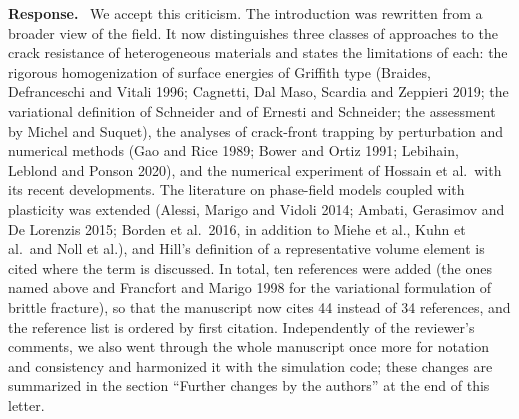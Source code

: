 \documentclass[pdflatex,sn-mathphys-num]{sn-jnl}
\newenvironment{response}
  {\par\noindent\textbf{Response.}\ }
  {\par}
\begin{document}
\begin{response}
We accept this criticism. The introduction was rewritten from a broader view of the field. It now distinguishes three classes of approaches to the crack resistance of heterogeneous materials and states the limitations of each: the rigorous homogenization of surface energies of Griffith type (Braides, Defranceschi and Vitali 1996; Cagnetti, Dal Maso, Scardia and Zeppieri 2019; the variational definition of Schneider and of Ernesti and Schneider; the assessment by Michel and Suquet), the analyses of crack-front trapping by perturbation and numerical methods (Gao and Rice 1989; Bower and Ortiz 1991; Lebihain, Leblond and Ponson 2020), and the numerical experiment of Hossain et al.\ with its recent developments. The literature on phase-field models coupled with plasticity was extended (Alessi, Marigo and Vidoli 2014; Ambati, Gerasimov and De Lorenzis 2015; Borden et al.\ 2016, in addition to Miehe et al., Kuhn et al.\ and Noll et al.), and Hill's definition of a representative volume element is cited where the term is discussed. In total, ten references were added (the ones named above and Francfort and Marigo 1998 for the variational formulation of brittle fracture), so that the manuscript now cites 44 instead of 34 references, and the reference list is ordered by first citation. Independently of the reviewer's comments, we also went through the whole manuscript once more for notation and consistency and harmonized it with the simulation code; these changes are summarized in the section ``Further changes by the authors'' at the end of this letter.
\end{response}
\end{document}
